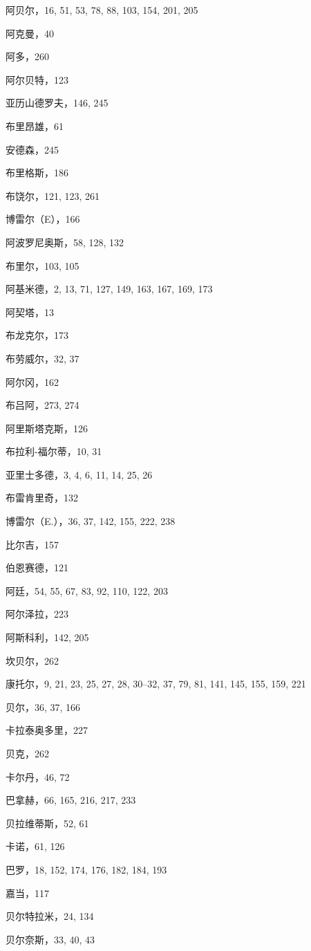 
阿贝尔，16, 51, 53, 78, 88, 103, 154, 201, 205

阿克曼，40

阿多，260

阿尔贝特，123

亚历山德罗夫，146, 245

布里昂雄，61

安德森，245

布里格斯，186

布饶尔，121, 123, 261

博雷尔（E），166

阿波罗尼奥斯，58, 128, 132

布里尔，103, 105

阿基米德，2, 13, 71, 127, 149, 163, 167, 169, 173

阿契塔，13

布龙克尔，173

布劳威尔，32, 37

阿尔冈，162

布吕阿，273, 274

阿里斯塔克斯，126

布拉利-福尔蒂，10, 31

亚里士多德，3, 4, 6, 11, 14, 25, 26

布雷肯里奇，132

博雷尔（E.），36, 37, 142, 155, 222, 238

比尔吉，157

伯恩赛德，121

阿廷，54, 55, 67, 83, 92, 110, 122, 203

阿尔泽拉，223

阿斯科利，142, 205

坎贝尔，262

康托尔，9, 21, 23, 25, 27, 28, 30--32, 37, 79, 81, 141, 145, 155, 159, 221

贝尔，36, 37, 166

卡拉泰奥多里，227

贝克，262

卡尔丹，46, 72

巴拿赫，66, 165, 216, 217, 233

贝拉维蒂斯，52, 61

卡诺，61, 126

巴罗，18, 152, 174, 176, 182, 184, 193

嘉当，117

贝尔特拉米，24, 134

贝尔奈斯，33, 40, 43

